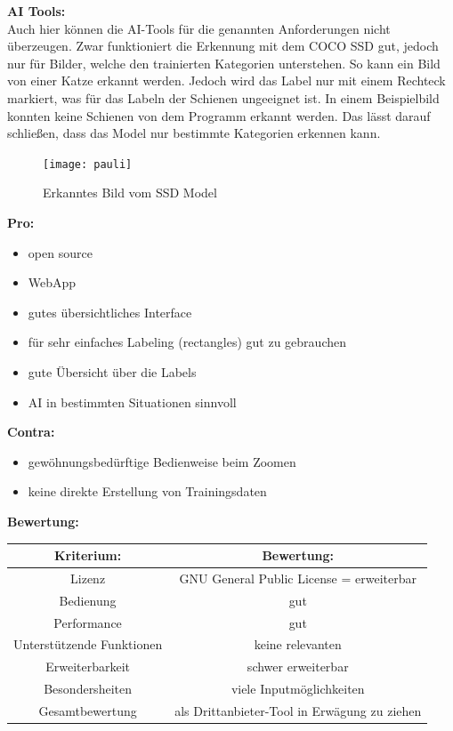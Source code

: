 \documentclass[11pt]{scrartcl}
\begin{document}
\noindent
\textbf{AI Tools:}
\\
 
\noindent
Auch hier können die AI-Tools für die genannten Anforderungen nicht überzeugen. Zwar funktioniert die Erkennung mit dem COCO SSD gut, jedoch nur für Bilder, welche den trainierten Kategorien unterstehen. So kann ein Bild von einer Katze erkannt werden. Jedoch wird das Label nur mit einem Rechteck markiert, was für das Labeln der Schienen ungeeignet ist. In einem Beispielbild konnten keine Schienen von dem Programm erkannt werden. Das lässt darauf schließen, dass das Model nur bestimmte Kategorien erkennen kann.

\begin{figure}[H]
  \texttt{[image: pauli]}
  \caption{Erkanntes Bild vom SSD Model}
\end{figure}

\textbf{Pro:} 
\begin{itemize}
	\item open source
	\item WebApp
	\item gutes übersichtliches Interface
	\item für sehr einfaches Labeling (rectangles) gut zu gebrauchen
	\item gute Übersicht über die Labels
	\item AI in bestimmten Situationen sinnvoll
\end{itemize}
\textbf{Contra:} 
\begin{itemize}
	\item gewöhnungsbedürftige Bedienweise beim Zoomen
	\item keine direkte Erstellung von Trainingsdaten
\end{itemize}


\noindent
\textbf{Bewertung:}
\\

\noindent 
\begin{tabular}[h]{c|c}
Kriterium: & Bewertung:\\
\hline
Lizenz & GNU General Public License = erweiterbar\\
Bedienung & gut\\
Performance & gut\\
Unterstützende Funktionen & keine relevanten\\
Erweiterbarkeit & schwer erweiterbar\\
Besondersheiten & viele Inputmöglichkeiten\\
\hline
Gesamtbewertung & als Drittanbieter-Tool in Erwägung zu ziehen\\
\end{tabular}
\\
\end{document}
